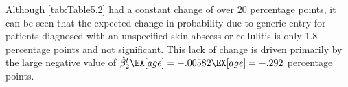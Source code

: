 \indent Although \autoref{tab:Table5.2} had a constant change of over 20 percentage points, it can be seen that the expected change in probability due to generic entry for patients diagnosed with an unspecified skin abscess or cellulitis is only 1.8 percentage points and not significant. This lack of change is driven primarily by the large negative value of $\hat{\beta}_2^t\EX[age] = -.00582\EX[age] = -.292$ percentage points.
\begin{landscape}

\end{landscape}
